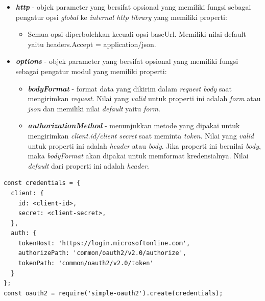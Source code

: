 \begin{itemize}
\begin{itemize}
    \end{itemize}
    \item \textbf{\textit{http}} - objek parameter yang bersifat opsional yang memiliki fungsi sebagai pengatur opsi \textit{global} ke \textit{internal http library} yang memiliki properti: 
    \begin{itemize}
        \item Semua opsi diperbolehkan kecuali opsi baseUrl. Memiliki nilai default yaitu headers.Accept = application/json. 
    \end{itemize}
    \item \textbf{\textit{options}} - objek parameter yang bersifat opsional yang memiliki fungsi sebagai pengatur modul yang memiliki properti: 
    \begin{itemize}
        \item \textbf{\textit{bodyFormat}} - format data yang dikirim dalam \textit{request body} saat mengirimkan \textit{request}. Nilai yang \textit{valid} untuk properti ini adalah \textit{form} atau \textit{json} dan memiliki nilai \textit{default} yaitu \textit{form}. 
        \item \textbf{\textit{authorizationMethod}} - menunjukkan metode yang dipakai untuk mengirimkan \textit{client.id/client secret} saat meminta \textit{token}. Nilai yang \textit{valid} untuk properti ini adalah \textit{header} atau \textit{body}. Jika properti ini bernilai \textit{body}, maka \textit{bodyFormat} akan dipakai untuk memformat kredensialnya. Nilai \textit{default} dari properti ini adalah \textit{header}.  
    \end{itemize}
\end{itemize}

\begin{lstlisting}
const credentials = {
  client: {
    id: <client-id>,
    secret: <client-secret>,
  },
  auth: {
    tokenHost: 'https://login.microsoftonline.com',
    authorizePath: 'common/oauth2/v2.0/authorize',
    tokenPath: 'common/oauth2/v2.0/token'
  }
};
const oauth2 = require('simple-oauth2').create(credentials);
\end{lstlisting}

